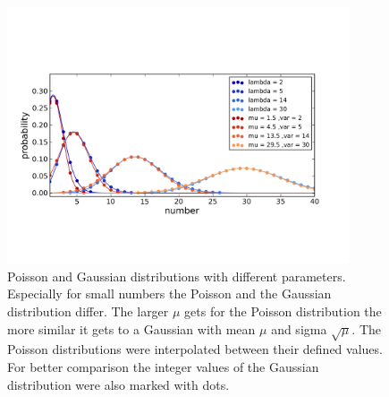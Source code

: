 \begin{figure}
\centering
\includegraphics[width = 0.9\textwidth]{pictures/poissgaussdistr.png}
	\caption{Poisson and Gaussian distributions with different parameters. Especially for small numbers the Poisson and the Gaussian distribution differ. The larger $\mu$ gets for the Poisson distribution the more similar it gets to a Gaussian with mean $\mu$ and sigma $\sqrt{\mu}$. The Poisson distributions were interpolated between their defined values. For better comparison the integer values of the Gaussian distribution were also marked with dots.}
	\label{poisgaussdistr}
\end{figure}

